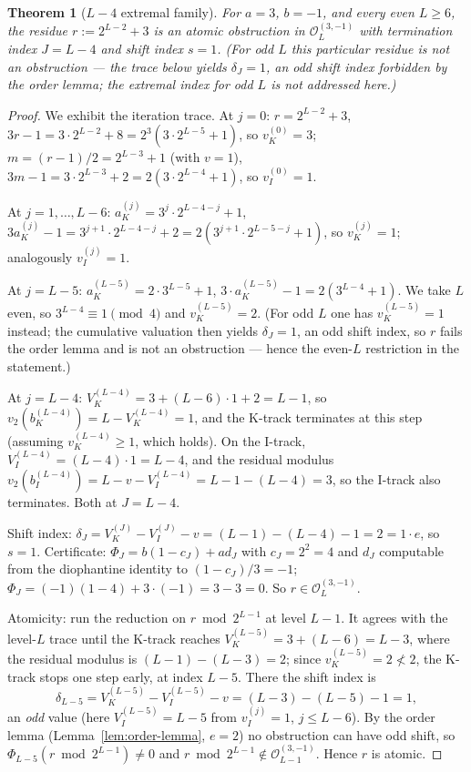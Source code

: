 \documentclass[11pt,reqno]{amsart}
\theoremstyle{plain}
\newtheorem{theorem}{Theorem}[section]
\theoremstyle{definition}
\theoremstyle{remark}
\newcommand{\Obs}{\mathcal{O}}
\newcommand{\Vk}{V_{K}}
\newcommand{\Vi}{V_{I}}
\newcommand{\vk}{v_{K}}
\newcommand{\vi}{v_{I}}
\newcommand{\vtwo}{v_{2}}
\begin{document}
\begin{theorem}[$L - 4$ extremal family]\label{thm:Lminus4-atom}
For $a = 3$, $b = -1$, and every \emph{even} $L \ge 6$, the residue
$r := 2^{L-2} + 3$ is an atomic obstruction in $\Obs_L^{(3,-1)}$ with
termination index $J = L - 4$ and shift index $s = 1$. (For odd $L$ this
particular residue is not an obstruction --- the trace below yields
$\delta_J = 1$, an odd shift index forbidden by the order lemma; the
extremal index for odd $L$ is not addressed here.)
\end{theorem}

\begin{proof}
We exhibit the iteration trace. At $j = 0$: $r = 2^{L-2} + 3$,
$3r - 1 = 3 \cdot 2^{L-2} + 8 = 2^3 (3 \cdot 2^{L-5} + 1)$, so
$\vk^{(0)} = 3$; $m = (r - 1)/2 = 2^{L-3} + 1$ (with $v = 1$),
$3m - 1 = 3 \cdot 2^{L-3} + 2 = 2(3 \cdot 2^{L-4} + 1)$, so $\vi^{(0)} =
1$.

At $j = 1, \ldots, L - 6$: $a_K^{(j)} = 3^j \cdot 2^{L-4-j} + 1$,
$3 a_K^{(j)} - 1 = 3^{j+1} \cdot 2^{L-4-j} + 2 = 2(3^{j+1} \cdot 2^{L-5-j} + 1)$,
so $\vk^{(j)} = 1$; analogously $\vi^{(j)} = 1$.

At $j = L - 5$: $a_K^{(L-5)} = 2 \cdot 3^{L-5} + 1$, $3 \cdot
a_K^{(L-5)} - 1 = 2 (3^{L-4} + 1)$. We take $L$ even, so $3^{L-4} \equiv
1 \pmod 4$ and $\vk^{(L-5)} = 2$. (For odd $L$ one has $\vk^{(L-5)} = 1$
instead; the cumulative valuation then yields $\delta_J = 1$, an odd
shift index, so $r$ fails the order lemma and is not an obstruction ---
hence the even-$L$ restriction in the statement.)

At $j = L - 4$: $\Vk^{(L-4)} = 3 + (L - 6) \cdot 1 + 2 = L - 1$, so
$\vtwo(b_K^{(L-4)}) = L - \Vk^{(L-4)} = 1$, and the K-track terminates
at this step (assuming $\vk^{(L-4)} \ge 1$, which holds). On the I-track,
$\Vi^{(L-4)} = (L - 4) \cdot 1 = L - 4$, and the residual modulus
$\vtwo(b_I^{(L-4)}) = L - v - \Vi^{(L-4)} = L - 1 - (L-4) = 3$, so the
I-track also terminates. Both at $J = L - 4$.

Shift index: $\delta_J = \Vk^{(J)} - \Vi^{(J)} - v = (L - 1) - (L - 4) - 1
= 2 = 1 \cdot e$, so $s = 1$. Certificate: $\Phi_J = b(1 - c_J) + a d_J$
with $c_J = 2^2 = 4$ and $d_J$ computable from the diophantine identity
to $(1 - c_J)/3 = -1$; $\Phi_J = (-1)(1 - 4) + 3 \cdot (-1) = 3 - 3 = 0$.
So $r \in \Obs_L^{(3, -1)}$.

Atomicity: run the reduction on $r \bmod 2^{L-1}$ at level $L - 1$. It
agrees with the level-$L$ trace until the K-track reaches
$\Vk^{(L-5)} = 3 + (L-6) = L - 3$, where the residual modulus is
$(L-1) - (L-3) = 2$; since $\vk^{(L-5)} = 2 \not< 2$, the K-track stops one
step early, at index $L - 5$. There the shift index is
\[
\delta_{L-5} = \Vk^{(L-5)} - \Vi^{(L-5)} - v = (L-3) - (L-5) - 1 = 1,
\]
an \emph{odd} value (here $\Vi^{(L-5)} = L - 5$ from $\vi^{(j)} = 1$,
$j \le L - 6$). By the order lemma (Lemma~\ref{lem:order-lemma}, $e = 2$)
no obstruction can have odd shift, so $\Phi_{L-5}(r \bmod 2^{L-1}) \ne 0$
and $r \bmod 2^{L-1} \notin \Obs_{L-1}^{(3,-1)}$. Hence $r$ is atomic.
\qedhere
\end{proof}
\end{document}
